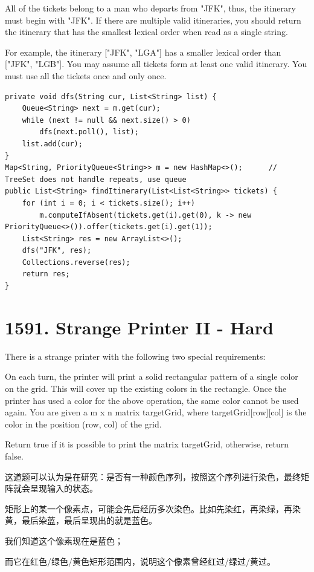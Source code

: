 \documentclass[9pt, b5paaper]{book}
\begin{document}
All of the tickets belong to a man who departs from "JFK", thus, the itinerary must begin with "JFK". If there are multiple valid itineraries, you should return the itinerary that has the smallest lexical order when read as a single string.

For example, the itinerary ["JFK", "LGA"] has a smaller lexical order than ["JFK", "LGB"].
You may assume all tickets form at least one valid itinerary. You must use all the tickets once and only once.
\begin{verbatim}
private void dfs(String cur, List<String> list) {
    Queue<String> next = m.get(cur);
    while (next != null && next.size() > 0) 
        dfs(next.poll(), list);
    list.add(cur);
}
Map<String, PriorityQueue<String>> m = new HashMap<>();      // TreeSet does not handle repeats, use queue
public List<String> findItinerary(List<List<String>> tickets) {
    for (int i = 0; i < tickets.size(); i++) 
        m.computeIfAbsent(tickets.get(i).get(0), k -> new PriorityQueue<>()).offer(tickets.get(i).get(1));
    List<String> res = new ArrayList<>();
    dfs("JFK", res);
    Collections.reverse(res);
    return res;
}
\end{verbatim}

\section{1591. Strange Printer II - Hard}
\label{sec-7-7}
There is a strange printer with the following two special requirements:

On each turn, the printer will print a solid rectangular pattern of a single color on the grid. This will cover up the existing colors in the rectangle.
Once the printer has used a color for the above operation, the same color cannot be used again.
You are given a m x n matrix targetGrid, where targetGrid[row][col] is the color in the position (row, col) of the grid.

Return true if it is possible to print the matrix targetGrid, otherwise, return false.

这道题可以认为是在研究：是否有一种颜色序列，按照这个序列进行染色，最终矩阵就会呈现输入的状态。

矩形上的某一个像素点，可能会先后经历多次染色。比如先染红，再染绿，再染黄，最后染蓝，最后呈现出的就是蓝色。

我们知道这个像素现在是蓝色；

而它在红色/绿色/黄色矩形范围内，说明这个像素曾经红过/绿过/黄过。
\end{document}
